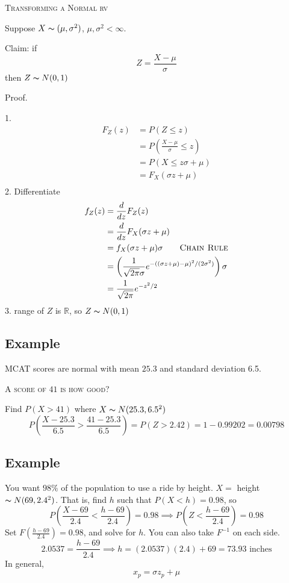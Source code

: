\textsc{Transforming a Normal rv}

Suppose $ X \thicksim (\mu,\sigma^2) $, $ \mu,\sigma^2<\infty $.

Claim: if
\[ Z=\frac{X-\mu}{\sigma}  \]
then $ Z \thicksim N(0,1) $

Proof.

1.
\begin{align*}
    F_Z(z)&=P(Z\le z)\\
    &=P\left(\frac{X-\mu}{\sigma}\le z\right)\\
    &=P\left(X\le z\sigma + \mu\right)\\
    &=F_X(\sigma z+\mu)\\
\end{align*}
2. Differentiate
\begin{align*}
    f_Z(z)&=\frac{d}{dz}F_Z(z)\\
    &=\frac{d}{dz}F_X(\sigma z+\mu)\\
    &=f_X(\sigma z+\mu)\sigma \qquad \textsc{Chain Rule}\\
    &=\left(\frac{1}{\sqrt{2\pi}\sigma}e^{-((\sigma z+\mu)-\mu)^2/(2\sigma^2)}\right)\sigma\\
    &=\frac{1}{\sqrt{2\pi}}e^{-z^2/2}
\end{align*}
3. range of $ Z $ is $ \mathbb{R} $, so $ Z \thicksim N(0,1) $

\subsection{Example}
MCAT scores are normal with mean $ 25.3 $ and standard deviation 6.5.

\textsc{A score of $ 41 $ is how good?}

Find $ P(X>41) $ where $ X \thicksim N(25.3,6.5^2) $
\[ P\left(\frac{X-25.3}{6.5}>\frac{41-25.3}{6.5}\right)=P(Z>2.42)=1-0.99202=0.00798 \]

\subsection{Example}
You want $ 98\% $ of the population to use a ride by height.
$ X= $ height $ \thicksim N(69,2.4^2) $. That is, find $ h $
such that $ P(X<h)=0.98 $, so
\[ P\left(\frac{X-69}{2.4}<\frac{h-69}{2.4}\right)=0.98\implies P\left(Z<\frac{h-69}{2.4}\right)=0.98\]
Set $F(\frac{h-69}{2.4})=0.98 $, and solve for $ h $. You can also take $ F^{-1} $ on each side.
\[ 2.0537=\frac{h-69}{2.4}\implies h=(2.0537)(2.4)+69=73.93\text{ inches} \]
In general,
\[ x_p=\sigma z_p+\mu \]